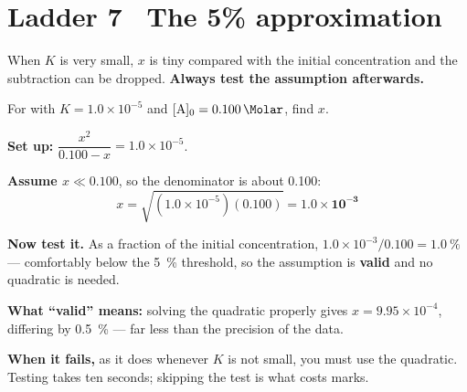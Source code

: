 \documentclass{apchem-worksheet}
\begin{document}
\section*{\sffamily Ladder 7 \textbullet\ The 5\% approximation}

When $K$ is very small, $x$ is tiny compared with the initial
concentration and the subtraction can be dropped. \textbf{Always test the
assumption afterwards.}

\begin{workedexample}
For  with $K = 1.0\times10^{-5}$ and
$[\ce{A}]_0 = \SI{0.100}{\Molar}$, find $x$.

\textbf{Set up:}
$\dfrac{x^2}{0.100 - x} = 1.0\times10^{-5}$.

\textbf{Assume $x \ll 0.100$}, so the denominator is about \num{0.100}:
\[ x = \sqrt{(1.0\times10^{-5})(0.100)} = \mathbf{1.0\times10^{-3}} \]

\textbf{Now test it.} As a fraction of the initial concentration,
$1.0\times10^{-3}/0.100 = \SI{1.0}{\percent}$ --- comfortably below the
\SI{5}{\percent} threshold, so the assumption is \textbf{valid} and no
quadratic is needed.

\textbf{What ``valid'' means:} solving the quadratic properly gives
$x = 9.95\times10^{-4}$, differing by \SI{0.5}{\percent} --- far less than
the precision of the data.

\textbf{When it fails,} as it does whenever $K$ is not small, you must use
the quadratic. Testing takes ten seconds; skipping the test is what costs
marks.
\end{workedexample}
\end{document}
